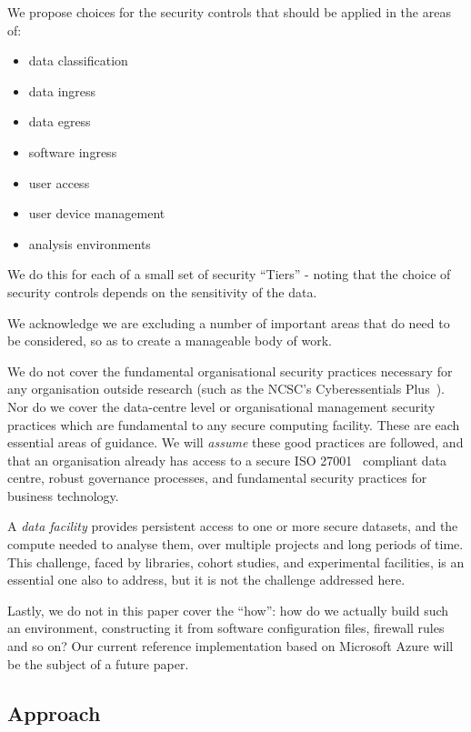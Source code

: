 \documentclass[10pt,a4paper,twocolumn]{article}
\begin{document}
We propose choices for the security controls that should be applied in the areas of:

\begin{itemize}
\item data classification
\item data ingress
\item data egress
\item software ingress
\item user access
\item user device management
\item analysis environments
\end{itemize}

We do this for each of a small set of security ``Tiers'' - noting that the choice of security controls depends on the sensitivity of the data.

We acknowledge we are excluding a number of important areas that do need to be considered, so as to create a manageable body of work.

We do not cover the fundamental organisational security practices 
necessary for any organisation outside research (such as the NCSC's Cyberessentials Plus~\cite{Cyberessentials}). Nor do we cover the data-centre level or organisational management security practices which are fundamental to any secure computing facility. These are each essential areas of guidance. We will \emph{assume} these good practices are followed, and that an organisation already has 
access to a secure ISO 27001~\cite{ISO27001} compliant data centre, robust governance processes, and fundamental security practices for business technology.

A \emph{data facility} provides
persistent access to one or more secure datasets, and the compute needed to analyse them, over multiple projects and long periods of time. This challenge,
faced by libraries, cohort studies, and experimental facilities, is an essential one also to address, but it is not the challenge addressed here.

Lastly, we do not in this paper cover the ``how'': how do we actually build such an environment, constructing
it from software configuration files, firewall rules and so on? Our current reference implementation based on
Microsoft Azure will be the subject of a future paper.

\subsection{Approach}
\end{document}
